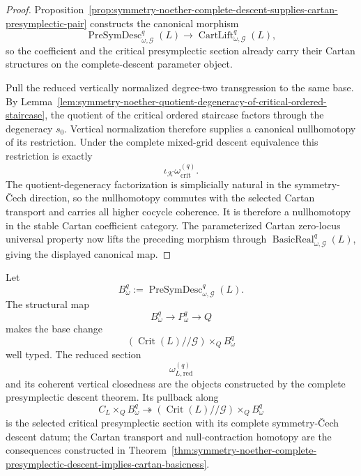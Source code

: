 \begin{proof}
Proposition~\ref{prop:symmetry-noether-complete-descent-supplies-cartan-presymplectic-pair}
constructs the canonical morphism
\[
\operatorname{PreSymDesc}_{\omega,\mathcal G}^{q}(L)
\longrightarrow
\operatorname{CartLift}_{\omega,\mathcal G}^{q}(L),
\]
so the coefficient and the critical presymplectic section already carry their
Cartan structures on the complete-descent parameter object.

Pull the reduced vertically normalized degree-two transgression to the same base.
By
Lemma~\ref{lem:symmetry-noether-quotient-degeneracy-of-critical-ordered-staircase},
the quotient of the critical ordered staircase factors through the degeneracy
$s_0$.  Vertical normalization therefore supplies a canonical nullhomotopy of its
restriction.  Under the complete mixed-grid descent equivalence this restriction is
exactly
\[
\iota_{\mathcal K}\omega_{\mathrm{crit}}^{(q)}.
\]
The quotient-degeneracy factorization is simplicially natural in the
symmetry-\v{C}ech direction, so the nullhomotopy commutes with the selected Cartan
transport and carries all higher cocycle coherence.  It is therefore a
nullhomotopy in the stable Cartan coefficient category.  The parameterized Cartan
zero-locus universal property now lifts the preceding morphism through
$\operatorname{BasicReal}_{\omega,\mathcal G}^{q}(L)$, giving the displayed
canonical map.
\end{proof}

\begin{theorem}
\label{thm:symmetry-noether-universal-parameterized-presymplectic-reduction}
Let
\[
B_\omega^q
:=
\operatorname{PreSymDesc}_{\omega,\mathcal G}^{q}(L).
\]
The structural map
\[
B_\omega^q\longrightarrow P_\omega^q\longrightarrow Q
\]
makes the base change
\[
\left(
\operatorname{Crit}(L)//\mathcal G
\right)
\times_QB_\omega^q
\]
well typed.  The reduced section
\[
\boxed{
\omega_{L,\mathrm{red}}^{(q)}
}
\]
and its coherent vertical closedness are the objects constructed by the complete
presymplectic descent theorem.  Its pullback along
\[
C_L\times_QB_\omega^q
\twoheadrightarrow
\left(
\operatorname{Crit}(L)//\mathcal G
\right)\times_QB_\omega^q
\]
is the selected critical presymplectic section with its complete symmetry-\v{C}ech
descent datum; the Cartan transport and null-contraction homotopy are the
consequences constructed in
Theorem~\ref{thm:symmetry-noether-complete-presymplectic-descent-implies-cartan-basicness}.
\end{theorem}

